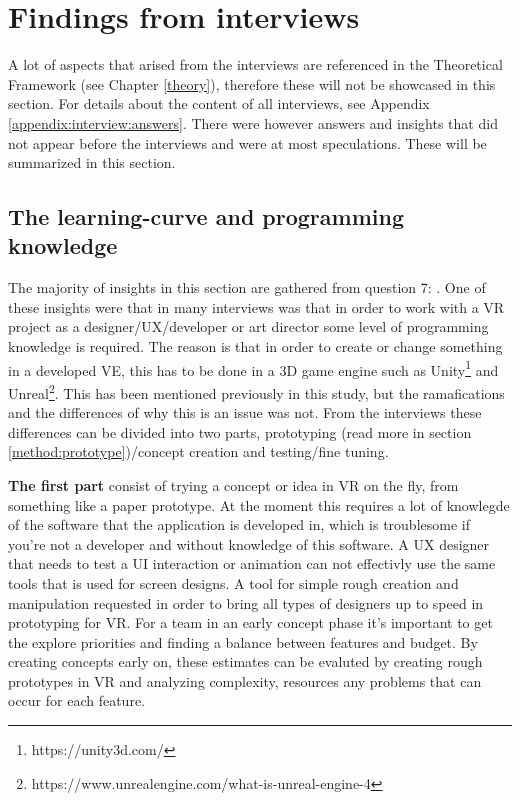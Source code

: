 \section{Findings from interviews}
\label{result:interviews}
A lot of aspects that arised from the interviews are referenced in the Theoretical Framework (see Chapter \ref{theory}), therefore these will not be showcased in this section. For details about the content of all interviews, see Appendix \ref{appendix:interview:answers}.  There were however answers and insights that did not appear before the interviews and were at most speculations. These will be summarized in this section.
\subsection{The learning-curve and programming knowledge}
\label{result:interviews:learningcurve}
The majority of insights in this section are gathered from question 7: . One of these insights were that in many interviews was that in order to work with a VR project as a designer/UX/developer or art director some level of programming knowledge is required. The reason is that in order to create or change something in a developed VE, this has to be done in a 3D game engine such as Unity\footnote{https://unity3d.com/} and Unreal\footnote{https://www.unrealengine.com/what-is-unreal-engine-4}. This has been mentioned previously in this study, but the ramafications and the differences of why this is an issue was not. From the interviews these differences can be divided into two parts, prototyping (read more in section \ref{method:prototype})/concept creation and testing/fine tuning.

\textbf{The first part} consist of trying a concept or idea in VR on the fly, from something like a paper prototype. At the moment this requires a lot of knowlegde of the software that the application is developed in, which is troublesome if you're not a developer and without knowledge of this software. A UX designer that needs to test a UI interaction or animation can not effectivly use the same tools that is used for  screen designs. A tool for simple rough creation and manipulation requested in order to bring all types of designers up to speed in prototyping for VR. For a team in an early concept phase it's important to get the explore priorities and finding a balance between features and budget. By creating concepts early on, these estimates can be evaluted by creating rough prototypes in VR and analyzing complexity, resources any problems that can occur for each feature.

